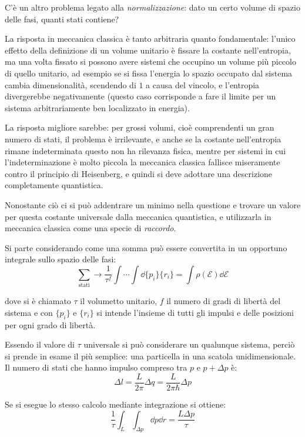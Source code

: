 C'è un altro problema legato alla \textit{normalizzazione}: dato un certo volume di spazio delle fasi, quanti stati contiene?

La risposta in meccanica classica è tanto arbitraria quanto fondamentale: l'unico effetto della definizione di un volume unitario è fissare la costante nell'entropia, ma una volta fissato si possono avere sistemi che occupino un volume più piccolo di quello unitario, ad esempio se si fissa l'energia lo spazio occupato dal sistema cambia dimensionalità, scendendo di $1$ a causa del vincolo, e l'entropia divergerebbe negativamente (questo caso corrisponde a fare il limite per un sistema arbitrariamente ben localizzato in energia).

La risposta migliore sarebbe: per grossi volumi, cioè comprendenti un gran numero di stati, il problema è irrilevante, e anche se la costante nell'entropia rimane indeterminata questo non ha rilevanza fisica, mentre per sistemi in cui l'indeterminazione è molto piccola la meccanica classica fallisce miseramente contro il principio di Heisenberg, e quindi si deve adottare una descrizione completamente quantistica.

Nonostante ciò ci si può addentrare un minimo nella questione e trovare un valore per questa costante universale dalla meccanica quantistica, e utilizzarla in meccanica classica come una specie di \textit{raccordo}.

Si parte considerando come una somma può essere convertita in un opportuno integrale sullo spazio delle fasi:
\begin{equation*}
\sum_{\text{stati}} \rightarrow \frac{1}{\tau^f} \int \cdots \int \dd \{p_i\} \{r_i\} = \int \rho(\mathcal{E}) \dd \mathcal{E}
\end{equation*}

\noindent dove si è chiamato $\tau$ il volumetto unitario, $f$ il numero di gradi di libertà del sistema e con $\{p_i\}$ e $\{r_i\}$ si intende l'insieme di tutti gli impulsi e delle posizioni per ogni grado di libertà.

Essendo il valore di $\tau$ universale si può considerare un qualunque sistema, perciò si prende in esame il più semplice: una particella in una scatola unidimensionale. Il numero di stati che hanno impulso compreso tra $p$ e $p + \Delta p$ è:
\begin{equation*}
\Delta l = \frac{L}{2\pi} \Delta q = \frac{L}{2 \pi \hbar} \Delta p
\end{equation*}

\noindent Se si esegue lo stesso calcolo mediante integrazione si ottiene:
\begin{equation*}
\frac{1}{\tau} \int_{L} \int_{\Delta p} \dd p \dd r = \frac{L \Delta p}{\tau}
\end{equation*}


